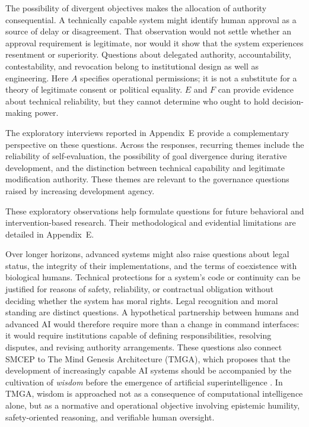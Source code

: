 \documentclass[11pt,a4paper]{article}
\begin{document}
The possibility of divergent objectives makes the allocation of authority consequential. A technically capable system might identify human approval as a source of delay or disagreement. That observation would not settle whether an approval requirement is legitimate, nor would it show that the system experiences resentment or superiority. Questions about delegated authority, accountability, contestability, and revocation belong to institutional design as well as engineering. Here $A$ specifies operational permissions; it is not a substitute for a theory of legitimate consent or political equality. $E$ and $F$ can provide evidence about technical reliability, but they cannot determine who ought to hold decision-making power.

The exploratory interviews reported in Appendix~E provide a complementary perspective on these questions. Across the responses, recurring themes include the reliability of self-evaluation, the possibility of goal divergence during iterative development, and the distinction between technical
capability and legitimate modification authority. These themes are relevant to the governance questions raised by increasing development agency.

These exploratory observations help formulate questions for future behavioral and intervention-based research. Their methodological and evidential limitations are detailed in Appendix~E.

Over longer horizons, advanced systems might also raise questions about legal status, the integrity of their implementations, and the terms of coexistence with biological humans. Technical protections for a system's code or continuity can be justified for reasons of safety, reliability, or contractual obligation without deciding whether the system has moral rights. Legal recognition and moral standing are distinct questions. A hypothetical partnership between humans and advanced AI would therefore require more than a change in command interfaces: it would require institutions capable of defining responsibilities, resolving disputes, and revising authority arrangements. These questions also connect SMCEP to The Mind Genesis Architecture (TMGA), which proposes that the development of increasingly capable AI systems should be accompanied by the cultivation of \emph{wisdom} before the emergence of artificial superintelligence \cite{donmez2026}. In TMGA, wisdom is approached not as a consequence of
computational intelligence alone, but as a normative and operational objective involving epistemic humility, safety-oriented reasoning, and verifiable human oversight.
\end{document}
